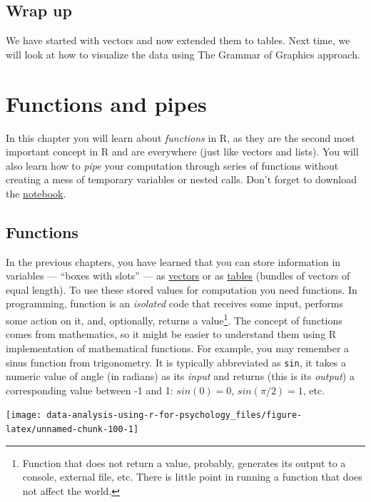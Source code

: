 \documentclass[
]{book}
\begin{document}
\hypertarget{wrap-up-1}{%
\section{Wrap up}\label{wrap-up-1}}

We have started with vectors and now extended them to tables. Next time, we will look at how to visualize the data using The Grammar of Graphics approach.

\hypertarget{functions}{%
\chapter{Functions and pipes}\label{functions}}

In this chapter you will learn about \emph{functions} in R, as they are the second most important concept in R and are everywhere (just like vectors and lists). You will also learn how to \emph{pipe} your computation through series of functions without creating a mess of temporary variables or nested calls. Don't forget to download the \href{notebooks/Seminar\%2004\%20-\%20functions.Rmd}{notebook}.

\hypertarget{functions-1}{%
\section{Functions}\label{functions-1}}

In the previous chapters, you have learned that you can store information in variables --- ``boxes with slots'' --- as \protect\hyperlink{vectors}{vectors} or as \protect\hyperlink{tables}{tables} (bundles of vectors of equal length). To use these stored values for computation you need functions. In programming, function is an \emph{isolated} code that receives some input, performs some action on it, and, optionally, returns a value\footnote{Function that does not return a value, probably, generates its output to a console, external file, etc. There is little point in running a function that does not affect the world.}. The concept of functions comes from mathematics, so it might be easier to understand them using R implementation of mathematical functions. For example, you may remember a sinus function from trigonometry. It is typically abbreviated as \texttt{sin}, it takes a numeric value of angle (in radians) as its \emph{input} and returns (this is its \emph{output}) a corresponding value between -1 and 1: \(sin(0) = 0\), \(sin(\pi/2) = 1\), etc.

\begin{center}\texttt{[image: data-analysis-using-r-for-psychology\_files/figure-latex/unnamed-chunk-100-1]} \end{center}
\end{document}
